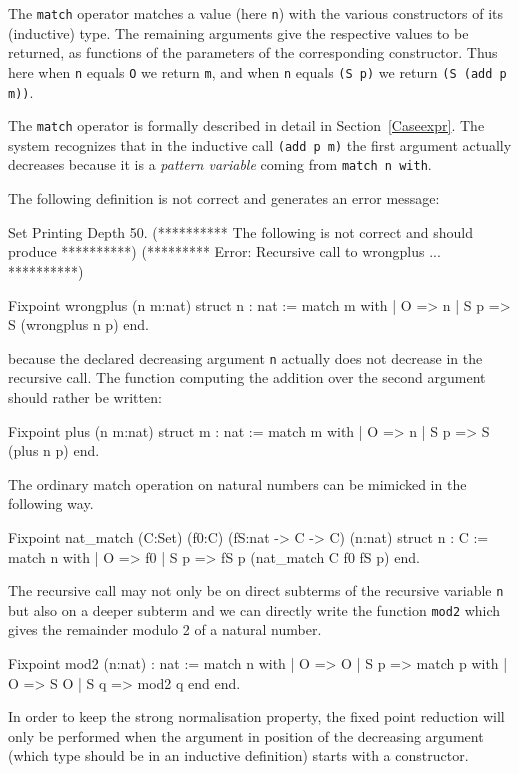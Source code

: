 The {\tt match} operator matches a value (here \verb:n:) with the
various constructors of its (inductive) type. The remaining arguments
give the respective values to be returned, as functions of the
parameters of the corresponding constructor. Thus here when \verb:n:
equals \verb:O: we return \verb:m:, and when \verb:n: equals 
\verb:(S p): we return \verb:(S (add p m)):.

The {\tt match} operator is formally described
in detail in Section~\ref{Caseexpr}.  The system recognizes that in
the inductive call {\tt (add p m)} the first argument actually
decreases because it is a {\em pattern variable} coming from {\tt match
  n with}.

\Example The following definition is not correct and generates an
error message:

\begin{coq_eval}
Set Printing Depth 50.
(********** The following is not correct and should produce **********)
(*********      Error: Recursive call to wrongplus ...      **********)
\end{coq_eval}
\begin{coq_example}
Fixpoint wrongplus (n m:nat) {struct n} : nat :=
  match m with
  | O => n
  | S p => S (wrongplus n p)
  end.
\end{coq_example}

because the declared decreasing argument {\tt n} actually does not
decrease in the recursive call.  The function computing the addition
over the second argument should rather be written:

\begin{coq_example*}
Fixpoint plus (n m:nat) {struct m} : nat :=
  match m with
  | O => n
  | S p => S (plus n p)
  end.
\end{coq_example*}

The ordinary match operation on natural numbers can be mimicked in the
following way.
\begin{coq_example*}
Fixpoint nat_match 
  (C:Set) (f0:C) (fS:nat -> C -> C) (n:nat) {struct n} : C :=
  match n with
  | O => f0
  | S p => fS p (nat_match C f0 fS p)
  end.
\end{coq_example*}
The recursive call may not only be on direct subterms of the recursive
variable {\tt n} but also on a deeper subterm and we can directly
write the function {\tt mod2} which gives the remainder modulo 2 of a
natural number.
\begin{coq_example*}
Fixpoint mod2 (n:nat) : nat :=
  match n with
  | O => O
  | S p => match p with
           | O => S O
           | S q => mod2 q
           end
  end.
\end{coq_example*}
In order to keep the strong normalisation property, the fixed point
reduction will only be performed when the argument in position of the
decreasing argument (which type should be in an inductive definition)
starts with a constructor.

